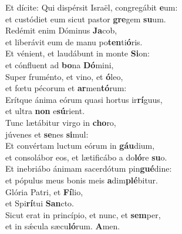 \evenverse Et dícite: Qui dispérsit Israël, congregábit \textbf{e}um:~\*\\
\evenverse et custódiet eum sicut pastor \textbf{gre}gem \textbf{su}um.\\
\oddverse Redémit enim Dóminus \textbf{Ja}cob,~\*\\
\oddverse et liberávit eum de manu po\textbf{ten}ti\textbf{ó}ris.\\
\evenverse Et vénient, et laudábunt in monte \textbf{Si}on:~\*\\
\evenverse et cónfluent ad \textbf{bo}na \textbf{Dó}mini,\\
\oddverse Super fruménto, et vino, et \textbf{ó}leo,~\*\\
\oddverse et fœtu pécorum et \textbf{ar}men\textbf{tó}rum:\\
\evenverse Erítque ánima eórum quasi hortus ir\textbf{rí}guus,~\*\\
\evenverse et ultra \textbf{non} e\textbf{sú}rient.\\
\oddverse Tunc lætábitur virgo in \textbf{cho}ro,~\*\\
\oddverse júvenes et \textbf{se}nes \textbf{si}mul:\\
\evenverse Et convértam luctum eórum in \textbf{gáu}dium,~\*\\
\evenverse et consolábor eos, et lætificábo a do\textbf{ló}re \textbf{su}o.\\
\oddverse Et inebriábo ánimam sacerdótum pin\textbf{gué}dine:~\*\\
\oddverse et pópulus meus bonis meis \textbf{a}dim\textbf{plé}bitur.\\
\evenverse Glória Patri, et \textbf{Fí}lio,~\*\\
\evenverse et Spi\textbf{rí}tui \textbf{San}cto.\\
\oddverse Sicut erat in princípio, et nunc, et \textbf{sem}per,~\*\\
\oddverse et in sǽcula sæcu\textbf{ló}rum. \textbf{A}men.\\
